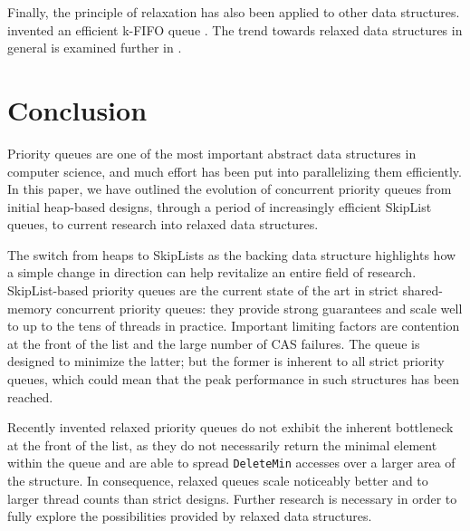
Finally, the principle of relaxation has also been applied to other data structures.
\citeauthor{kirsch2012fast} invented an efficient k-FIFO queue \cite{kirsch2012fast}.
The trend towards relaxed data structures in general is examined further in
\cite{shavit2011data,kirsch2012incorrect}.

\section{Conclusion} \label{sec:conclusion}

Priority queues are one of the most important abstract data structures in computer science,
and much effort has been put into parallelizing them efficiently. In this paper,
we have outlined the evolution of concurrent priority queues from initial heap-based designs,
through a period of increasingly efficient SkipList queues, to current research into relaxed data structures.

The switch from heaps to SkipLists as the backing data structure highlights how a simple change in
direction can help revitalize an entire field of research. SkipList-based priority queues are the current
state of the art in strict shared-memory concurrent priority queues: they provide strong guarantees
and scale well to up to the tens of threads in practice. Important limiting factors are contention
at the front of the list and the large number of \ac{CAS} failures.
The \citeauthor{linden2013skiplist} queue is designed
to minimize the latter; but the former is inherent to all strict priority queues, which could mean
that the peak performance in such structures has been reached.

Recently invented relaxed priority queues do not exhibit the inherent bottleneck at the front of the list,
as they do not necessarily return the minimal element within the queue and are able to spread
\lstinline|DeleteMin| accesses over a larger area of the structure. In consequence, relaxed queues scale noticeably
better and to larger thread counts than strict designs. Further research is necessary in order to fully
explore the possibilities provided by relaxed data structures.
